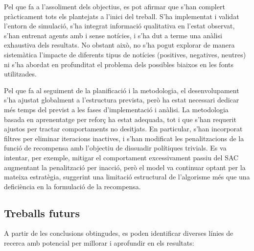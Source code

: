 \documentclass[12pt,a4paper,twoside]{book}
\begin{document}
Pel que fa a l’assoliment dels objectius, es pot afirmar que s’han complert pràcticament tots els plantejats a l’inici del treball. S’ha implementat i validat l’entorn de simulació, s’ha integrat informació qualitativa en l’estat observat, s’han entrenat agents amb i sense notícies, i s’ha dut a terme una anàlisi exhaustiva dels resultats. No obstant això, no s’ha pogut explorar de manera sistemàtica l’impacte de diferents tipus de notícies (positives, negatives, neutres) ni s’ha abordat en profunditat el problema dels possibles biaixos en les fonts utilitzades.

Pel que fa al seguiment de la planificació i la metodologia, el desenvolupament s’ha ajustat globalment a l’estructura prevista, però ha estat necessari dedicar més temps del previst a les fases d’implementació i anàlisi. La metodologia basada en aprenentatge per reforç ha estat adequada, tot i que s’han requerit ajustos per tractar comportaments no desitjats. En particular, s’han incorporat filtres per eliminar iteracions inactives, i s’han modificat les penalitzacions de la funció de recompensa amb l’objectiu de dissuadir polítiques trivials. Es va intentar, per exemple, mitigar el comportament excessivament passiu del SAC augmentant la penalització per inacció, però el model va continuar optant per la mateixa estratègia, suggerint una limitació estructural de l’algorisme més que una deficiència en la formulació de la recompensa.

\subsection{Treballs futurs}

A partir de les conclusions obtingudes, es poden identificar diverses línies de recerca amb potencial per millorar i aprofundir en els resultats:
\end{document}
